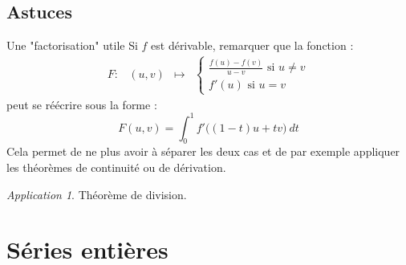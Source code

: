 \documentclass[french]{book}
\theoremstyle{plain}
\theoremstyle{definition}
\theoremstyle{remark}
\newtheorem*{app}{Application}
\begin{document}
\section{Astuces}
\begin{AS}{Une "factorisation" utile} Si $f$ est dérivable, remarquer que la fonction : $$\begin{array}{lrcl}
	F:&(u,v)&\longmapsto&\begin{cases}
		\displaystyle\frac{f(u)-f(v)}{u-v}\text{ si }u\ne v \\
		f'(u)\text{ si }u=v
	\end{cases}
\end{array} $$ peut se réécrire sous la forme : $$F(u,v)=\int_{0}^{1}f'\big((1-t)u+tv\big)\ dt$$ Cela permet de ne plus avoir à séparer les deux cas et de par exemple appliquer les théorèmes de continuité ou de dérivation.
\end{AS}
\begin{app}
	Théorème de division.
\end{app}


\chapter{Séries entières}
\localtableofcontents
\end{document}
